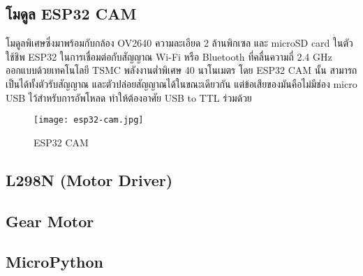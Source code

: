\subsection{โมดูล ESP32 CAM}
โมดูลพิเศษซึ่งมาพร้อมกับกล้อง OV2640 ความละเอียด 2 ล้านพิกเซล และ microSD card ในตัว ใช้ชิพ ESP32 ในการเชื่อมต่อกับสัญญาณ Wi-Fi หรือ Bluetooth ที่คลื่นความถี่ 2.4 GHz
ออกแบบด้วยเทคโนโลยี TSMC พลังงานต่ำพิเศษ 40 นาโนเมตร โดย ESP32 CAM นั้น สามารถเป็นได้ทั้งตัวรับสัญญาณ และตัวปล่อยสัญญาณได้ในขณะเดียวกัน แต่ข้อเสียของมันคือไม่มีช่อง micro USB
ไว้สำหรับการอัพโหลด ทำให้ต้องอาศัย USB to TTL ร่วมด้วย \cite{ESP32CAM}
\begin{figure}[ht]
    \centering
    \texttt{[image: esp32-cam.jpg]}
    \caption{ESP32 CAM}
    \label{fig:esp32-cam}
\end{figure}

\subsection{L298N (Motor Driver)}

\subsection{Gear Motor}

\subsection{MicroPython}